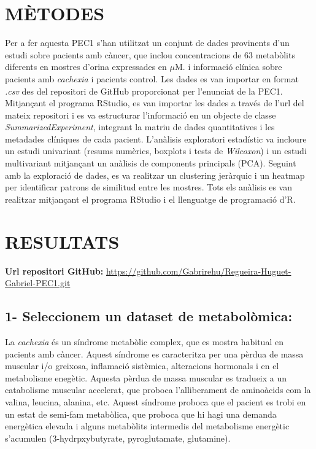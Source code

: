 \documentclass[
]{article}
\begin{document}
\section{MÈTODES}\label{muxe8todes}

Per a fer aquesta PEC1 s'han utilitzat un conjunt de dades provinents
d'un estudi sobre pacients amb càncer, que inclou concentracions de 63
metabòlits diferents en mostres d'orina expressades en \(\mu\)M. i
informació clínica sobre pacients amb \emph{cachexia} i pacients
control. Les dades es van importar en format \emph{.csv} des del
repositori de GitHub proporcionat per l'enunciat de la PEC1. Mitjançant
el programa RStudio, es van importar les dades a través de l'url del
mateix repositori i es va estructurar l'informació en un objecte de
classe \emph{SummarizedExperiment}, integrant la matriu de dades
quantitatives i les metadades clíniques de cada pacient. L'anàlisis
exploratori estadístic va incloure un estudi univariant (resums
numèrics, boxplots i tests de \emph{Wilcoxon}) i un estudi multivariant
mitjançant un anàlisis de components principals (PCA). Seguint amb la
exploració de dades, es va realitzar un clustering jeràrquic i un
heatmap per identificar patrons de similitud entre les mostres. Tots els
anàlisis es van realitzar mitjançant el programa RStudio i el llenguatge
de programació d'R.

\section{RESULTATS}\label{resultats}

\textbf{Url repositori GitHub:}
\url{https://github.com/Gabrirehu/Regueira-Huguet-Gabriel-PEC1.git}

\subsection{1- Seleccionem un dataset de
metabolòmica:}\label{seleccionem-un-dataset-de-metaboluxf2mica}

La \emph{cachexia} és un síndrome metabòlic complex, que es mostra
habitual en pacients amb càncer. Aquest síndrome es caracteritza per una
pèrdua de massa muscular i/o greixosa, inflamació sistèmica, alteracions
hormonals i en el metabolisme enegètic. Aquesta pèrdua de massa muscular
es tradueix a un catabolisme muscular accelerat, que proboca
l'alliberament de aminoàcids com la valina, leucina, alanina, etc.
Aquest síndrome proboca que el pacient es trobi en un estat de semi-fam
metabòlica, que proboca que hi hagi una demanda energètica elevada i
alguns metabòlits intermedis del metabolisme energètic s'acumulen
(3-hydrpxybutyrate, pyroglutamate, glutamine).
\end{document}
